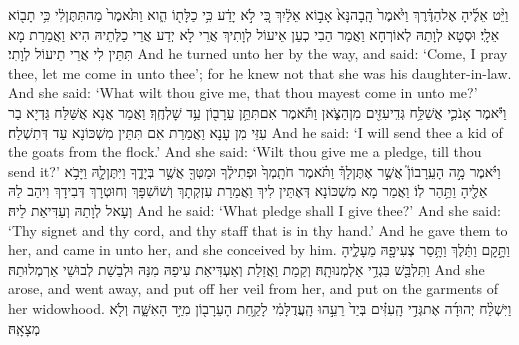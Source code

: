 {וַיֵּ֨ט אֵלֶ֜יהָ אֶל\maqqaf הַדֶּ֗רֶךְ וַיֹּ֙אמֶר֙ הָֽבָה\maqqaf נָּא֙ אָב֣וֹא אֵלַ֔יִךְ כִּ֚י לֹ֣א יָדַ֔ע כִּ֥י כַלָּת֖וֹ הִ֑וא וַתֹּ֙אמֶר֙ מַה\maqqaf תִּתֶּן\maqqaf לִ֔י כִּ֥י תָב֖וֹא אֵלָֽי׃}
{וּסְטָא לְוָתַהּ לְאוֹרְחָא וַאֲמַר הַבִי כְעַן אֵיעוֹל לְוָתִיךְ אֲרֵי לָא יְדַע אֲרֵי כַלְּתֵיהּ הִיא וַאֲמַרַת מָא תִּתֵּין לִי אֲרֵי תֵיעוֹל לְוָתִי׃}
{And he turned unto her by the way, and said: ‘Come, I pray thee, let me come in unto thee’; for he knew not that she was his daughter-in-law. And she said: ‘What wilt thou give me, that thou mayest come in unto me?’}{}
{וַיֹּ֕אמֶר אָנֹכִ֛י אֲשַׁלַּ֥ח גְּדִֽי\maqqaf עִזִּ֖ים מִן\maqqaf הַצֹּ֑אן וַתֹּ֕אמֶר אִם\maqqaf תִּתֵּ֥ן עֵרָב֖וֹן עַ֥ד שָׁלְחֶֽךָ׃}
{וַאֲמַר אֲנָא אֲשַּׁלַּח גַּדְיָא בַר עִזֵּי מִן עָנָא וַאֲמַרַת אִם תִּתֵּין מִשְׁכּוֹנָא עַד דְּתִשְׁלַח׃}
{And he said: ‘I will send thee a kid of the goats from the flock.’ And she said: ‘Wilt thou give me a pledge, till thou send it?’}{}
{וַיֹּ֗אמֶר מָ֣ה הָעֵֽרָבוֹן֮ אֲשֶׁ֣ר אֶתֶּן\maqqaf לָךְ֒ וַתֹּ֗אמֶר חֹתָֽמְךָ֙ וּפְתִילֶ֔ךָ וּמַטְּךָ֖ אֲשֶׁ֣ר בְּיָדֶ֑ךָ וַיִּתֶּן\maqqaf לָ֛הּ וַיָּבֹ֥א אֵלֶ֖יהָ וַתַּ֥הַר לֽוֹ׃}
{וַאֲמַר מָא מִשְׁכּוֹנָא דְּאֶתֵּין לִיךְ וַאֲמַרַת עִזְקְתָךְ וְשׁוֹשִׁפָּךְ וְחוּטְרָךְ דְּבִידָךְ וִיהַב לַהּ וְעָאל לְוָתַהּ וְעַדִּיאַת לֵיהּ׃}
{And he said: ‘What pledge shall I give thee?’ And she said: ‘Thy signet and thy cord, and thy staff that is in thy hand.’ And he gave them to her, and came in unto her, and she conceived by him.}{}
{וַתָּ֣קׇם וַתֵּ֔לֶךְ וַתָּ֥סַר צְעִיפָ֖הּ מֵעָלֶ֑יהָ וַתִּלְבַּ֖שׁ בִּגְדֵ֥י אַלְמְנוּתָֽהּ׃}
{וְקַמַת וַאֲזַלַת וְאַעְדִּיאַת עִיפַהּ מִנַּהּ וּלְבַשַׁת לְבוּשֵׁי אַרְמְלוּתַהּ׃}
{And she arose, and went away, and put off her veil from her, and put on the garments of her widowhood.}{}
{וַיִּשְׁלַ֨ח יְהוּדָ֜ה אֶת\maqqaf גְּדִ֣י הָֽעִזִּ֗ים בְּיַד֙ רֵעֵ֣הוּ הָֽעֲדֻלָּמִ֔י לָקַ֥חַת הָעֵרָב֖וֹן מִיַּ֣ד הָאִשָּׁ֑ה וְלֹ֖א מְצָאָֽהּ׃}
